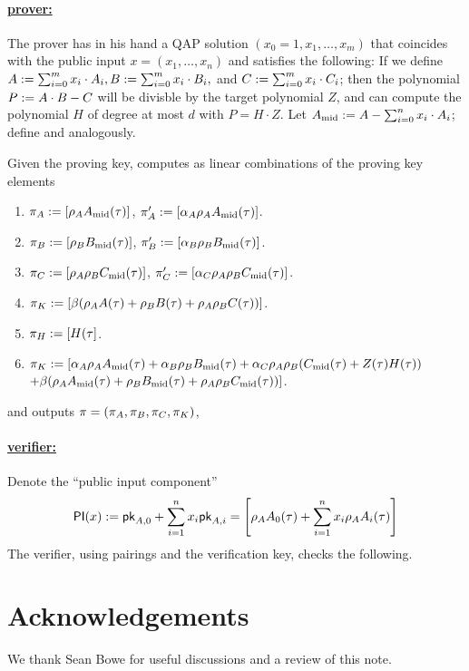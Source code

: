 \documentclass[11pt]{article}
\numberwithin{figure}{section} %
\begin{document}
\newcommand{\amid}{\ensuremath{A_{\mathrm{mid}}}\xspace}
\paragraph{\underline{prover:}\\}
The prover has in his hand a QAP solution $(x_0=1,x_1,\ldots,x_m)$ that coincides with the public input $x=(x_1,\ldots,x_n)$ and satisfies the following:
If we define $A:= \sum_{i=0}^m x_i\cdot A_i, B:= \sum_{i=0}^m x_i \cdot B_i,$ and $C:= \sum_{i=0}^m x_i \cdot C_i$;
then the polynomial $P:= A\cdot B - C$ will be divisble by the target polynomial $Z$, and \per can compute the polynomial $H$ of degree at most $d$ with $P=H\cdot Z$. Let $\amid\defeq A -\sum_{i=0}^n x_i\cdot A_i$; define \midb and \midc analogously.

Given the proving key, \per computes as linear combinations of the proving key elements
\begin{enumerate}
\item $\pi_A\defeq \enc{\rho_A \amid(\tau)}$, $\pi'_A\defeq \enc{\alpha_A\rho_A \amid(\tau)}$.
\item $\pi_B:= \left[\rho_B B_{\mathrm{mid}}(\tau)\right]$, $\pi'_B := \left[\alpha_B\rho_B B_{\mathrm{mid}}(\tau)\right]$.
\item $\pi_C:= \left[\rho_A\rho_B C_{\mathrm{mid}}(\tau)\right]$, $\pi'_C := \left[\alpha_C\rho_A\rho_B C_{\mathrm{mid}}(\tau)\right]$.

\item $\pi_K:= \left[\beta(\rho_A A(\tau) + \rho_B B(\tau) + \rho_A\rho_B C(\tau))\right]$.
\item $\pi_H:= \left[H(\tau\right]$.
\item $\pi_K:= [\alpha_A \rho_AA_{\mathrm{mid}}(\tau) + \alpha_B \rho_BB_{\mathrm{mid}}(\tau) + \alpha_C\rho_A\rho_B(C_{\mathrm{mid}}(\tau)+ Z(\tau)H(\tau))$
$+ \beta(\rho_AA_{\mathrm{mid}}(\tau)+\rho_BB_{\mathrm{mid}}(\tau) + \rho_A\rho_BC_{\mathrm{mid}}(\tau))]$.
\end{enumerate}
 and outputs $\pi = (\pi_A,\pi_B,\pi_C,\pi_K)$,
 

\paragraph{\underline{\bctv verifier:}\\}
Denote the ``public input component'' 
\[ \mathsf{PI}(x) := \mathsf{pk}_{A,0} + \sum_{i=1}^n x_i \mathsf{pk}_{A,i} = \left[\rho_A A_0(\tau) + \sum_{i=1}^n x_i \rho_A A_i(\tau) \right]\]
 The verifier, using pairings and the verification key, checks the following.
 
 
\section*{Acknowledgements}
We thank Sean Bowe for useful discussions and a review of this note.


\end{document}
